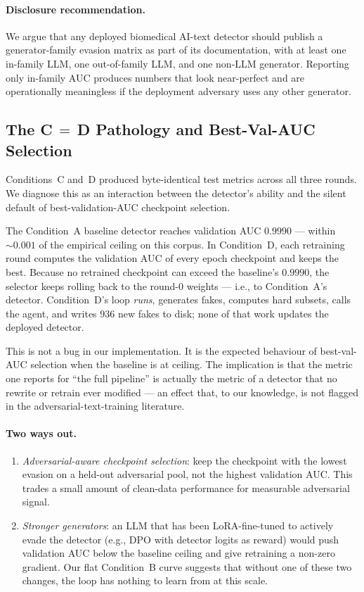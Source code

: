 \documentclass[conference]{IEEEtran}
\begin{document}
\paragraph{Disclosure recommendation.}
We argue that any deployed biomedical AI-text detector should publish a
generator-family evasion matrix as part of its documentation, with at
least one in-family LLM, one out-of-family LLM, and one non-LLM
generator. Reporting only in-family AUC produces numbers that look
near-perfect and are operationally meaningless if the deployment
adversary uses any other generator.

\subsection{The C\,$=$\,D Pathology and Best-Val-AUC Selection}
\label{ssec:cd_path}

Conditions~C and~D produced byte-identical test metrics across all three
rounds. We diagnose this as an interaction between the detector's
ability and the silent default of best-validation-AUC checkpoint
selection.

The Condition~A baseline detector reaches validation AUC \(0.9990\) —
within \(\sim 0.001\) of the empirical ceiling on this corpus. In
Condition~D, each retraining round computes the validation AUC of
every epoch checkpoint and keeps the best. Because no retrained
checkpoint can exceed the baseline's \(0.9990\), the selector keeps
rolling back to the round-0 weights — i.e., to Condition~A's
detector. Condition~D's loop \emph{runs}, generates fakes, computes
hard subsets, calls the agent, and writes \(936\) new fakes to disk;
none of that work updates the deployed detector.

This is not a bug in our implementation. It is the expected behaviour
of best-val-AUC selection when the baseline is at ceiling. The
implication is that the metric one reports for ``the full pipeline''
is actually the metric of a detector that no rewrite or retrain ever
modified — an effect that, to our knowledge, is not flagged in the
adversarial-text-training literature.

\paragraph{Two ways out.}
\begin{enumerate}[leftmargin=*]
\item \emph{Adversarial-aware checkpoint selection}: keep the checkpoint
  with the lowest evasion on a held-out adversarial pool, not the
  highest validation AUC. This trades a small amount of clean-data
  performance for measurable adversarial signal.
\item \emph{Stronger generators}: an LLM that has been LoRA-fine-tuned
  to actively evade the detector (e.g., DPO with detector logits as
  reward) would push validation AUC below the baseline ceiling and
  give retraining a non-zero gradient. Our flat
  Condition~B curve suggests that without one of these two changes,
  the loop has nothing to learn from at this scale.
\end{enumerate}
\end{document}
